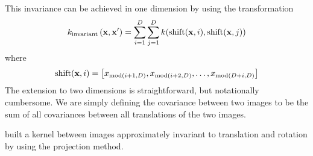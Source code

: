 This invariance can be achieved in one dimension by using the transformation
%
\begin{align}
k_\textnormal{invariant} \left( \vx, \vx' \right) = %
\sum_{i=1}^D \sum_{j=1}^D k( \shift(\vx, i), \shift(\vx, j) )
\end{align}
%
where
%
\begin{align}
\operatorname{shift}({\bf{x}}, i) = \big[ x_{\operatorname{mod}( i + 1, D )}, x_{\operatorname{mod}( i + 2, D )}, \dots, x_{\operatorname{mod}( D + i, D )} \big]
\end{align}
%
%
%
%
The extension to two dimensions is straightforward, but notationally cumbersome.
We are simply defining the covariance between two images to be the sum of all covariances between all translations of the two images.

\citet{kondor2008group} built a kernel between images approximately invariant to translation and rotation by using the projection method.




